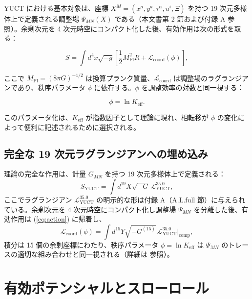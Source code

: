 \documentclass[11pt,a4paper]{article}
\theoremstyle{remark}
\newcommand{\Keff}{K_{\mathrm{eff}}}
\newcommand{\Mpl}{M_{\mathrm{Pl}}}
\begin{document}
	YUCT における基本対象は、座標 $X^M = (x^\mu, y^a, \tau^\alpha, u^i, \Xi)$ を持つ 19 次元多様体上で定義される調整場 $\Psi_{MN}(X)$ である（本文書第 2 節および付録 A 参照）。余剰次元を 4 次元時空にコンパクト化した後、有効作用は次の形式を取る：
	
	\begin{equation}
		S = \int d^4x \sqrt{-g} \left[ \frac{1}{2} \Mpl^2 R + \mathcal{L}_{\mathrm{coord}}(\phi) \right],
		\label{eq:action}
	\end{equation}
	
	ここで $\Mpl = (8\pi G)^{-1/2}$ は換算プランク質量、$\mathcal{L}_{\mathrm{coord}}$ は調整場のラグランジアンであり、秩序パラメータ $\phi$ に依存する。$\phi$ を調整効率の対数と同一視する：
	
	\begin{equation}
		\phi = \ln \Keff.
		\label{eq:phi-def}
	\end{equation}
	
	このパラメータ化は、$\Keff$ が指数因子として理論に現れ、相転移が $\phi$ の変化によって便利に記述されるために選択される。
	
	\subsection{完全な 19 次元ラグランジアンへの埋め込み}
	
	理論の完全な作用は、計量 $G_{MN}$ を持つ 19 次元多様体上で定義される：
	\begin{equation}
		S_{\text{YUCT}} = \int d^{19}X \sqrt{-G} \, \mathcal{L}_{\text{YUCT}}^{35.0},
		\label{eq:full-action}
	\end{equation}
	ここでラグランジアン $\mathcal{L}_{\text{YUCT}}^{35.0}$ の明示的な形は付録 A（A.L.full 節）に与えられている。余剰次元を 4 次元時空にコンパクト化し調整場 $\Psi_{MN}$ を分離した後、有効作用は (\ref{eq:action}) に帰着し、
	\begin{equation}
		\mathcal{L}_{\mathrm{coord}}(\phi) = \int d^{15}Y \sqrt{-G^{(15)}} \, \mathcal{L}_{\text{YUCT}}^{35.0}\big|_{\text{comp}},
	\end{equation}
	積分は 15 個の余剰座標にわたり、秩序パラメータ $\phi = \ln\Keff$ は $\Psi_{MN}$ のトレースの適切な組み合わせと同一視される（詳細は \cite{Yakushev2026} 参照）。
	
	\section{有効ポテンシャルとスローロール}
	\label{sec:potential}
	
\end{document}
